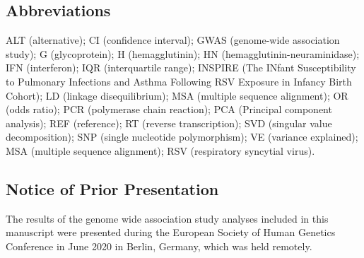 \documentclass{article} %
\begin{document}

\clearpage
\subsection*{Abbreviations}
ALT (alternative);
CI (confidence interval);
GWAS (genome-wide association study);
G (glycoprotein);
H (hemagglutinin);
HN (hemagglutinin-neuraminidase);
IFN (interferon);
IQR (interquartile range);
INSPIRE (The INfant Susceptibility to Pulmonary Infections and Asthma Following RSV Exposure in Infancy Birth Cohort);
LD (linkage disequilibrium);
MSA (multiple sequence alignment);
OR (odds ratio);
PCR (polymerase chain reaction);
PCA (Principal component analysis);
REF (reference);
RT (reverse transcription);
SVD (singular value decomposition);
SNP (single nucleotide polymorphism);
VE (variance explained);
MSA (multiple sequence alignment);
RSV (respiratory syncytial virus).

\subsection*{Notice of Prior Presentation}
The results of the genome wide association study analyses included in this manuscript were presented during the European Society of Human Genetics Conference in June 2020 in Berlin, Germany, which was held remotely.
\end{document}
